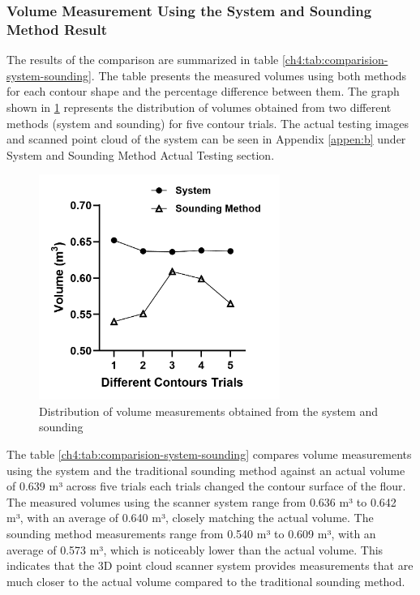 \subsubsection{Volume Measurement Using the System and Sounding Method Result}
The results of the comparison are summarized in table \ref{ch4:tab:comparision-system-sounding}. The table presents the measured volumes using both methods for each contour shape and the percentage difference between them. The graph shown in \ref{ch4:fig:system-and-sounding-method} represents the distribution of volumes obtained from two different methods (system and sounding) for five contour trials. The actual testing images and scanned point cloud of the system can be seen in Appendix \ref{appen:b} under System and Sounding Method Actual Testing section. \\

\begin{figure}[H]
	\centering
	\includegraphics[width=0.7\textwidth]{Figures/system-and-sounding-method}
	\caption{Distribution of volume measurements obtained from the system and sounding}
	\label{ch4:fig:system-and-sounding-method}
\end{figure}

The table \ref{ch4:tab:comparision-system-sounding} compares volume measurements using the system and the traditional sounding method against an actual volume of 0.639 m³ across five trials each trials changed the contour surface of the flour. The measured volumes using the scanner system range from 0.636 m³ to 0.642 m³, with an average of 0.640 m³, closely matching the actual volume. The sounding method measurements range from 0.540 m³ to 0.609 m³, with an average of 0.573 m³, which is noticeably lower than the actual volume. This indicates that the 3D point cloud scanner system provides measurements that are much closer to the actual volume compared to the traditional sounding method. \\


